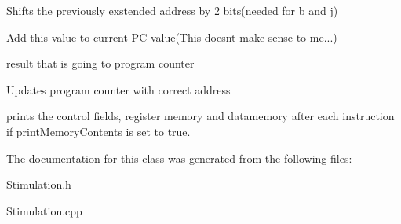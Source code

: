 Shifts the previously exstended address by 2 bits(needed for b and j)

Add this value to current PC value(This doesnt make sense to me...)

result that is going to program counter

Updates program counter with correct address

prints the control fields, register memory and datamemory after each instruction if print\+Memory\+Contents is set to true. 

The documentation for this class was generated from the following files\+:\begin{DoxyCompactItemize}
\item 
Stimulation.\+h\item 
Stimulation.\+cpp\end{DoxyCompactItemize}
